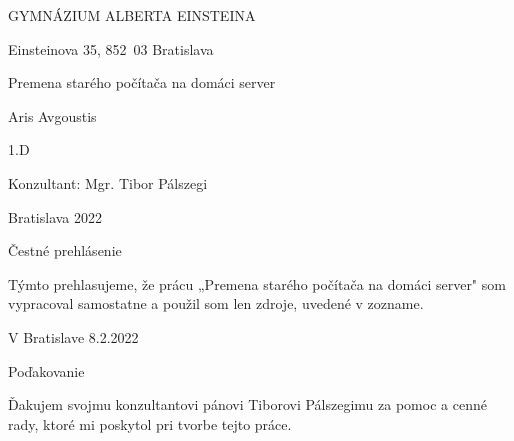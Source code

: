 \begin{center}
    {\fontsize{16}{16}\selectfont GYMNÁZIUM ALBERTA EINSTEINA}  %

    \vspace{0.5cm}

    {\fontsize{16}{16}\selectfont Einsteinova 35, \mbox{852 03} Bratislava}  %

    \vspace{8cm}

    {\fontsize{16}{16}\selectfont Premena starého počítača na domáci server}  %

    \vspace{7cm}

    {\fontsize{16}{16}\selectfont Aris Avgoustis}

    \vspace{0.5cm}

    {\fontsize{16}{16}\selectfont 1.D}

    \vspace{1cm}

    {\fontsize{16}{16}\selectfont Konzultant: Mgr. Tibor Pálszegi}

    \vspace{1cm}

    {\fontsize{16}{16}\selectfont Bratislava 2022}

\end{center}

    \newpage

    \vspace*{\fill}

    {\fontsize{14}{14}\selectfont\noindent Čestné prehlásenie}

    \vspace{1cm}

    Týmto prehlasujeme, že prácu „Premena starého počítača na domáci server" som vypracoval samostatne a použil som len zdroje, uvedené v zozname.

    \vspace{1cm}

    V Bratislave 8.2.2022

    {\raggedleft\itshape{}\par
    }

    \newpage %

    \vspace*{\fill}

    {\fontsize{14}{14}\selectfont\noindent Poďakovanie}

    \vspace{1cm}

    Ďakujem svojmu konzultantovi pánovi Tiborovi Pálszegimu za pomoc a cenné rady, ktoré mi poskytol pri tvorbe tejto práce.
